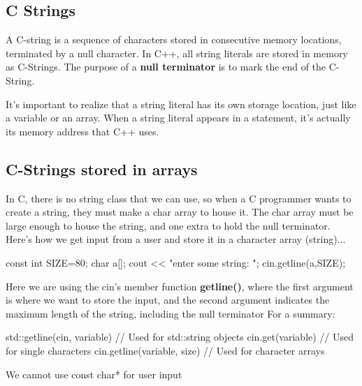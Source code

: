 \documentclass{report}
\begin{document}
    \bigbreak \noindent 
    \subsection{C Strings }
    \bigbreak \noindent 
    \begin{concept}
 A C-string is a sequence of characters stored in consecutive memory locations, terminated by a null character. In C++, all string literals are stored in memory as C-Strings. The purpose of  a \textbf{null terminator} is to mark the end of the C-String.
	\end{concept}
    \bigbreak \noindent 
    It's important to realize that a string literal has its own storage location, just like a variable or an array. When a string literal appears in a statement, it's actually its memory address that C++ uses. 

    \pagebreak \bigbreak \noindent 
    \subsection{C-Strings stored in arrays}
    \bigbreak \noindent 
    In C, there is no string class that we can use, so when a C programmer wants to create a string, they must make a char array to house it. The char array must be large enough to house the string, and one extra to hold the null terminator.
    \bigbreak \noindent 
    Here's how we get input from a user and store it in a character array (string)...
    \bigbreak \noindent 
    
    \begin{cppcode}
const int SIZE=80;
char a[];
cout << "enter some string: ";
cin.getline(a,SIZE);
    \end{cppcode}
    
    \bigbreak \noindent 
    Here we are using the cin's member function \textbf{getline()}, where the first argument is where we want to store the input, and the second argument indicates the maximum length of the string, including the null terminator
    \bigbreak \noindent 
    For a summary:
    \bigbreak \noindent 
    
    \begin{cppcode}
std::getline(cin, variable) // Used for std::string objects
cin.get(variable) // Used for single characters
cin.getline(variable, size) // Used for character arrays
    \end{cppcode}
    
    \bigbreak \noindent 
    \begin{notebox}
			We cannot use const char* for user input
		\end{notebox}
\end{document}
